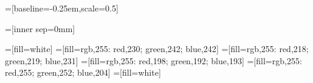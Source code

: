 \usetikzlibrary{arrows.meta}
\usetikzlibrary{arrows}
\usetikzlibrary{backgrounds}
\usetikzlibrary{decorations.pathreplacing}
\usetikzlibrary{matrix}
\usetikzlibrary{patterns}
\usetikzlibrary{positioning}
\usetikzlibrary{shapes,shapes.geometric,shapes.misc}
\usetikzlibrary{shadows}






{}=[baseline=-0.25em,scale=0.5]



=[inner sep=0mm]

=[fill=white]
=[fill={rgb,255: red,230; green,242; blue,242}]
=[fill={rgb,255: red,218; green,219; blue,231}]
=[fill={rgb,255: red,198; green,192; blue,193}]
=[fill={rgb,255: red,255; green,252; blue,204}]
=[fill=white]

\newcommand{\umlobj}[4][]{
    \node[rectangle split, rectangle split parts=2, draw, align=center, text
        centered, inner sep=1.5ex, #1]
        (#3) {$\ll$#2$\gg$ \\ \textbf{#3} \nodepart[align=left]{second} #4};
}
\newcommand{\umlsimpleobj}[3][]{
    \node[draw, align=center, text centered, inner sep=1.5ex, #1]
        (#3) {$\ll$#2$\gg$ \\ \textbf{#3}};
}
